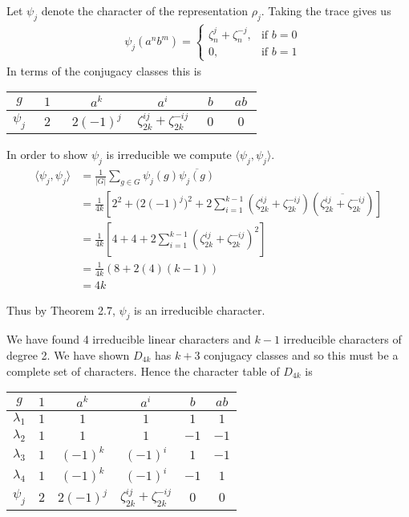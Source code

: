 Let $\psi_j$ denote the character of the representation $\rho_j$. Taking the trace gives us
\begin{align*}
    &\psi_j(a^nb^m) = \begin{cases}
        \zeta_n^j + \zeta_n^{-j}, &\text{if } b = 0 \\
        0,                &\text{if } b =1
                    \end{cases}
\end{align*}
In terms of the conjugacy classes this is
\begin{center}
\begin{tabular}{c|ccccc}
    $g$ &$1$ & $a^k$ & $a^i$ & $b$ & $ab$ \\ \hline
    $\psi_j$ & $ \ \ 2 \ \ $ & $\ 2(-1)^j\ $ & $\zeta_{2k}^{ij} + \zeta_{2k}^{-ij}$ & $\ \ 0 \ \ $ & $ \ \ 0 \ \ $
\end{tabular}
\end{center}

In order to show $\psi_j$ is irreducible we compute $\langle \psi_j, \psi_j \rangle$.
\begin{align*}
    \langle \psi_j, \psi_j \rangle &= \frac{1}{|G|}\sum_{g \in G} \psi_j(g) \overline{\psi_j(g)} \\
                           &= \frac{1}{4k}\left[2^2 + \bigl(2(-1)^j\bigr)^2 + 
                               2\sum_{i=1}^{k-1}\left(\zeta_{2k}^{ij} + 
                               \zeta_{2k}^{-ij}\right)\left(\overline{\zeta_{2k}^{ij} + 
                       \zeta_{2k}^{-ij}}\right)\right] \\
%                             
               &= \frac{1}{4k}\left[ 4 + 4 + 2\sum_{i=1}^{k-1}\left(\zeta_{2k}^{ij} + \zeta_{2k}^{-ij}\right)^2 
               \right] \\
               &= \frac{1}{4k}(8 + 2(4)(k-1)) \\
               &= 4k \end{align*}

Thus by Theorem 2.7, $\psi_j$ is an irreducible character. 

We have found 4 irreducible linear characters and $k-1$ irreducible characters of degree 2. We have shown $D_{4k}$ 
has $k+3$ conjugacy classes and so this must be a complete set of characters. Hence the character table of $D_{4k}$ 
is 

\begin{center}
\begin{tabular}{c|ccccc}
    $g$ &$1$ & $a^k$ & $a^i$ & $b$ & $ab$ \\ \hline
    $\lambda_1$ & $1$ & $1$ & $1$ & $1$ & $1$ \\
    $\lambda_2$ & $1$ & $1$ & $1$ & $-1$ & $-1$ \\
    $\lambda_3$ & $1$ & $(-1)^k$ & $(-1)^i$ & $1$ & $-1$ \\
    $\lambda_4$ & $1$ & $(-1)^k$ & $(-1)^i$ & $-1$ & $1$ \\
    $\psi_j$ & $2$ & $2(-1)^j$ & $\zeta_{2k}^{ij} + \zeta_{2k}^{-ij}$ & $0$ & $0$
\end{tabular}
\end{center}

